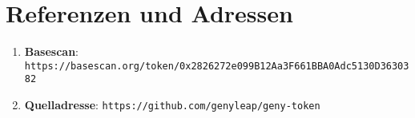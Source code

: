 \documentclass[a4paper,12pt,openany]{book}
\begin{document}
\section*{Referenzen und Adressen}

\begin{enumerate}
    \item \textbf{Basescan}: \texttt{https://basescan.org/token/0x2826272e099B12Aa3F661BBA0Adc5130D3630382}
    \item \textbf{Quelladresse}: \texttt{https://github.com/genyleap/geny-token}
\end{enumerate}
\end{document}
